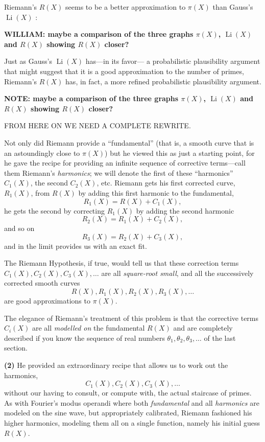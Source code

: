 \documentclass[11pt,draft]{article}
\DeclareMathOperator{\Li}{Li}
\theoremstyle{plain}
\theoremstyle{definition}
\numberwithin{equation}{section}
\numberwithin{figure}{section}
\numberwithin{table}{section}
\begin{document}
{  Riemann's $R(X)$ seems to be a better approximation to $\pi(X)$ than Gauss's $\Li(X)$ :
  
   
\bigskip

{\bf WILLIAM: maybe a comparison of the three graphs $\pi(X)$, $\Li(X)$ and $R(X)$ showing $R(X)$ closer?}


   
\bigskip

Just as Gauss's $\Li(X)$ has---in its favor--- a probabilistic
plausibility argument that might suggest that it is a good
approximation to the number of primes, Riemann's $R(X)$ has, in fact,
a more refined probabilistic plausibility argument.


   
\bigskip

{\bf NOTE: maybe a comparison of the three graphs $\pi(X)$, $\Li(X)$ and $R(X)$ showing $R(X)$ closer?}


   
\bigskip
  
\centerline{FROM HERE ON WE NEED A COMPLETE REWRITE.}

\bigskip


Not only did Riemann provide a ``fundamental'' (that is, a smooth curve
that is an astoundingly close to $\pi(X)$) but he viewed this as just a
starting point, for he gave the recipe for providing an infinite
sequence of corrective terms---call them Riemann's {\em harmonics}; we
will denote the first of these ``harmonics'' $C_1(X)$, the second
$C_2(X)$, etc.  Riemann gets his first corrected curve, $R_1(X)$, from
$R(X)$ by adding this first harmonic to the fundamental, $$R_1(X) =
R(X) + C_1(X),$$ he gets the second by correcting $R_1(X)$ by adding
the second harmonic $$R_2(X) = R_1 (X) + C_2(X),$$ and so on $$R_3(X)
= R_2 (X) + C_3(X),$$ and in the limit provides us with an exact fit.

The Riemann Hypothesis, if true, would tell us that these correction
terms $C_1(X), C_2(X),C_3(X),\dots$ are all {\em square-root small},
and all the successively corrected smooth curves $$R(X), R_1(X),
R_2(X),R_3(X),\dots$$ are good approximations to $\pi(X)$.

\bigskip

The elegance of Riemann's treatment of this problem is that the
corrective terms $C_i(X)$ are all {\em modelled on} the fundamental
$R(X)$ and are completely described if you know the sequence of real
numbers $\theta_1, \theta_2, \theta_3,\dots$ of the last section.


{\bf (2) }He provided an extraordinary recipe that allows us to work
out the harmonics, $$C_1(X), C_2(X),C_3(X),\dots$$ without our having
to consult, or compute with, the actual staircase of primes. As with
Fourier's modus operandi where both {\em fundamental} and all {\em
  harmonics} are modeled on the sine wave, but appropriately
calibrated, Riemann fashioned his higher harmonics, modeling them all
on a single function, namely his initial guess $R(X)$.
 

}
\end{document}
